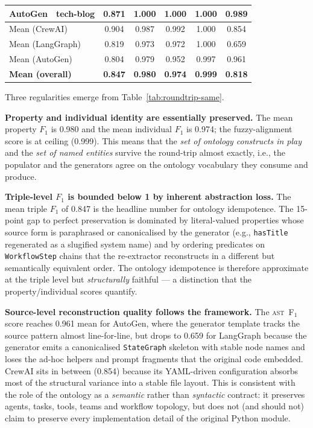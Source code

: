 \begin{table}[ht]
{\begin{tabular}{l l c c c c c}
    AutoGen   & tech-blog              & 0.871 & 1.000 & 1.000 & 1.000 & 0.989\\
    \midrule
    \multicolumn{2}{l}{Mean (CrewAI)}    & 0.904 & 0.987 & 0.992 & 1.000 & 0.854\\
    \multicolumn{2}{l}{Mean (LangGraph)} & 0.819 & 0.973 & 0.972 & 1.000 & 0.659\\
    \multicolumn{2}{l}{Mean (AutoGen)}   & 0.804 & 0.979 & 0.952 & 0.997 & 0.961\\
    \multicolumn{2}{l}{\textbf{Mean (overall)}} & \textbf{0.847} & \textbf{0.980} & \textbf{0.974} & \textbf{0.999} & \textbf{0.818}\\
    \bottomrule
  \end{tabular}
  }
\end{table}

Three regularities emerge from Table~\ref{tab:roundtrip-same}.

\textbf{Property and individual identity are essentially preserved.}
The mean property $F_1$ is 0.980 and the mean individual $F_1$ is
0.974; the fuzzy-alignment score is at ceiling (0.999). This means
that the \emph{set of ontology constructs in play} and the
\emph{set of named entities} survive the round-trip almost exactly,
i.e., the populator and the generators agree on the ontology
vocabulary they consume and produce.

\textbf{Triple-level $F_1$ is bounded below 1 by inherent
abstraction loss.} The mean triple $F_1$ of 0.847 is the headline
number for ontology idempotence. The 15-point gap to perfect
preservation is dominated by literal-valued properties whose source
form is paraphrased or canonicalised by the generator
(e.g., \texttt{hasTitle} regenerated as a slugified system name) and
by ordering predicates on \texttt{WorkflowStep} chains that the
re-extractor reconstructs in a different but semantically equivalent
order. The ontology idempotence is therefore approximate at the
triple level but \emph{structurally} faithful — a distinction that the
property/individual scores quantify.

\textbf{Source-level reconstruction quality follows the framework.}
The \textsc{ast}~F$_1$ score reaches 0.961 mean for AutoGen, where the
generator template tracks the source pattern almost line-for-line, but
drops to 0.659 for LangGraph because the generator emits a
canonicalised \texttt{StateGraph} skeleton with stable node names and
loses the ad-hoc helpers and prompt fragments that the original code
embedded. CrewAI sits in between (0.854) because its YAML-driven
configuration absorbs most of the structural variance into a stable
file layout. This is consistent with the role of the ontology as a
\emph{semantic} rather than \emph{syntactic} contract: it preserves
agents, tasks, tools, teams and workflow topology, but does not (and
should not) claim to preserve every implementation detail of the
original Python module.

